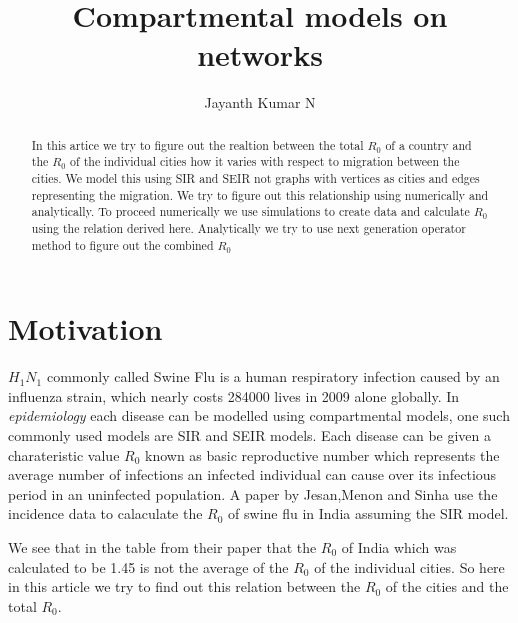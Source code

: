 \documentclass{article}
\begin{document}
\author{Jayanth Kumar N}
\title{\textbf{Compartmental models on networks}}
\maketitle

\begin{abstract}
   In this artice we try to figure out the realtion between the total
   $R_{0}$ of a country and the $R_{0}$ of the individual cities how
   it varies with respect to migration between the cities. We model
   this using SIR and SEIR not graphs with vertices as cities and
   edges representing the migration. We try to figure out this
   relationship using numerically and analytically. To proceed
   numerically we use simulations to create data and calculate $R_{0}$
   using the relation derived here. Analytically we try to use next
   generation operator method to figure out the combined $R_{0}$
\end{abstract}

\section{Motivation}
$H_{1}N_{1}$ commonly called Swine Flu is a human respiratory
infection caused by an influenza strain, which nearly costs 284000
lives in 2009 alone globally. In \textit{epidemiology} each disease
can be modelled using compartmental models, one such commonly used
models are SIR and SEIR models. Each disease can be given a
charateristic value $R_{0}$ known as basic reproductive number which
represents the average number of infections an infected individual can
cause over its infectious period in an uninfected population. A paper
by Jesan,Menon and Sinha use the incidence data to calaculate the
$R_{0}$ of swine flu in India assuming the SIR model.


We see that in the table from their paper that the $R_{0}$ of India
which was calculated to be 1.45 is not the average of the $R_{0}$ of
the individual cities. So here in this article we try to find out this
relation between the $R_{0}$ of the cities and the total $R_{0}$.
\end{document}

